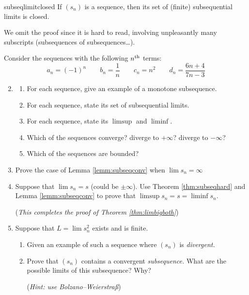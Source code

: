 \begin{thm}{}{subseqlimitclosed}
If $(s_n)$ is a sequence, then its set of (finite) subsequential limits is closed.
\end{thm}

We omit the proof since it is hard to read, involving unpleasantly many subscripts (subsequences of subsequences\ldots). %


\goodbreak


\begin{exercisessec}{}{}
	\exstart %
	Consider the sequences with the following $n\textsuperscript{th}$ terms:
	\[a_n=(-1)^n\qquad b_n=\frac 1n\qquad c_n=n^2\qquad d_n=\frac{6n+4}{7n-3}\]
	\begin{enumerate}\setcounter{enumi}{1}  
	  \item[]\begin{enumerate}
		  \item For each sequence, give an example of a monotone subsequence.
		  \item For each sequence, state its set of subsequential limits.
		  \item For each sequence, state its $\limsup$ and $\liminf$.
		  \item Which of the sequences converge? diverge to $+\infty$? diverge to $-\infty$?
		  \item Which of the sequences are bounded?
	  \end{enumerate}
  
  
  	\item Prove the case of Lemma \ref{lemm:subseqconv} when $\lim s_n=\infty$
  

		\item\label{exs:liminfsuplim} Suppose that $\lim s_n=s$ (could be $\pm \infty$). Use Theorem \ref{thm:subseqhard} and Lemma \ref{lemm:subseqconv} to prove that $\limsup s_n=s=\liminf s_n$.\par
		(\emph{This completes the proof of Theorem \ref{thm:limbigboth}})
	
  
		\item Suppose that $L=\lim s_n^2$ exists and is finite.
		\begin{enumerate}
		  \item Given an example of such a sequence where $(s_n)$ is \emph{divergent.}
		  \item Prove that $(s_n)$ contains a convergent \emph{subsequence.} What are the possible limits of this subsequence? Why?\par
		(\emph{Hint: use Bolzano--Weierstraß})
		\end{enumerate}
		

\end{enumerate}
\end{exercisessec}
